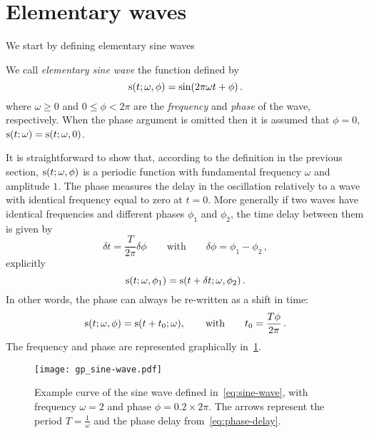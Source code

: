 \section{Elementary waves}
We start by defining elementary sine waves
\begin{definition}
  We call \emph{elementary sine wave} the function defined by
  \begin{equation}
    \mathrm{s}(t;\omega,\phi)=\sin(2\pi\omega t + \phi)\,.\label{eq:sine-wave}
  \end{equation}
  where $\omega\geq 0$ and $0\leq\phi<2\pi$ are the \emph{frequency} and \emph{phase} of
  the wave, respectively. When the phase argument is omitted then it is assumed that
  $\phi=0$, \ie $\mathrm{s}(t;\omega)=\mathrm{s}(t;\omega,0)$.
\end{definition}
\noindent It is straightforward to show that, according to the definition in the previous
section, $\mathrm{s}(t;\omega,\phi)$ is a periodic function with fundamental frequency $\omega$
and amplitude $1$. The phase measures the delay in the oscillation relatively to a wave
with identical frequency equal to zero at $t=0$. More generally if two waves have
identical frequencies and different phases $\phi_1$ and $\phi_2$, the time delay between
them is given by
\begin{equation}
  \delta t =\frac{T}{2\pi}\delta\phi\qquad\text{with}\qquad\delta\phi=\phi_1-\phi_2\,,
\end{equation}
explicitly
\begin{equation}
  \mathrm{s}(t;\omega,\phi_1)=\mathrm{s}(t+\delta t;\omega,\phi_2)\,.
\end{equation}
In other words, the phase can always be re-written as a shift in time:
\begin{equation}
  \mathrm{s}(t;\omega,\phi)=\mathrm{s}(t+t_0;\omega),
  \qquad\text{with}\qquad
  t_0 = \frac{T\phi}{2\pi}\,.\label{eq:phase-delay}
\end{equation}
The frequency and phase are represented graphically in~\cref{fig:sine-wave}.
\begin{figure}[t]
  \centering
  \texttt{[image: gp\_sine-wave.pdf]}
  \caption{Example curve of the sine wave defined in~\cref{eq:sine-wave}, with frequency
    $\omega=2$ and phase $\phi=0.2\times 2\pi$. The arrows represent the period
  $T=\frac{1}{\omega}$ and the phase delay from~\cref{eq:phase-delay}.}
  \label{fig:sine-wave}
\end{figure}


